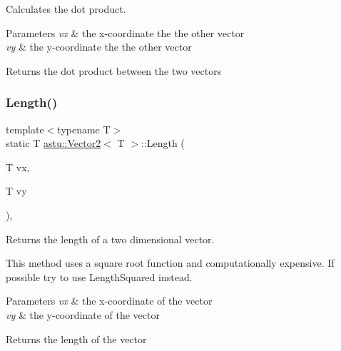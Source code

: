 Calculates the dot product.


\begin{DoxyParams}{Parameters}
{\em vx} & the x-\/coordinate the the other vector \\
\hline
{\em vy} & the y-\/coordinate the the other vector \\
\hline
\end{DoxyParams}
\begin{DoxyReturn}{Returns}
the dot product between the two vectors 
\end{DoxyReturn}
\mbox{\label{classastu_1_1Vector2_a7fdf839b6c3444121dc6fb2eb88c200e}} 
\subsubsection{\texorpdfstring{Length()}{Length()}\hspace{0.1cm}{\footnotesize\ttfamily [1/2]}}
{\footnotesize\ttfamily template$<$typename T$>$ \\
static T \hyperlink{classastu_1_1Vector2}{astu\+::\+Vector2}$<$ T $>$\+::Length (\begin{DoxyParamCaption}\item[{T}]{vx,  }\item[{T}]{vy }\end{DoxyParamCaption})\hspace{0.3cm}{\ttfamily [inline]}, {\ttfamily [static]}}

Returns the length of a two dimensional vector.

This method uses a square root function and computationally expensive. If possible try to use {\ttfamily Length\+Squared} instead.


\begin{DoxyParams}{Parameters}
{\em vx} & the x-\/coordinate of the vector \\
\hline
{\em vy} & the y-\/coordinate of the vector \\
\hline
\end{DoxyParams}
\begin{DoxyReturn}{Returns}
the length of the vector 
\end{DoxyReturn}
\mbox{\label{classastu_1_1Vector2_ab195006315ba4e54f6e89e01727dbd08}} 
